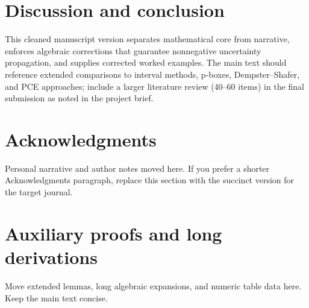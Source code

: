 \documentclass[11pt]{amsart}
\begin{document}
\section{Discussion and conclusion}
This cleaned manuscript version separates mathematical core from narrative, enforces algebraic corrections that guarantee nonnegative uncertainty propagation, and supplies corrected worked examples. The main text should reference extended comparisons to interval methods, p-boxes, Dempster--Shafer, and PCE approaches; include a larger literature review (40--60 items) in the final submission as noted in the project brief.

\section*{Acknowledgments}
Personal narrative and author notes moved here. If you prefer a shorter Acknowledgments paragraph, replace this section with the succinct version for the target journal. 

\appendix
\section{Auxiliary proofs and long derivations}
Move extended lemmas, long algebraic expansions, and numeric table data here. Keep the main text concise.



\end{document}

